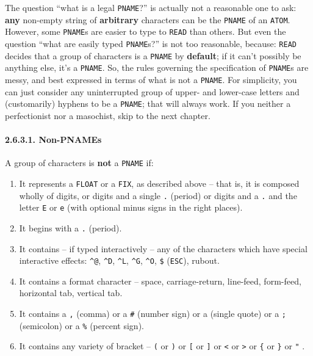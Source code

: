 \documentclass[a4paper,]{article}
\let\oldparagraph\paragraph
\renewcommand{\paragraph}[1]{\oldparagraph{#1}\mbox{}}
\begin{document}
The question ``what is a legal \texttt{PNAME}?'' is actually not a reasonable one to ask: \textbf{any} non-empty string of
\textbf{arbitrary} characters can be the \texttt{PNAME} of an \texttt{ATOM}. However, some \texttt{PNAME}s are easier to
type to \texttt{READ} than others. But even the question ``what are easily typed \texttt{PNAME}s?'' is not too reasonable,
because: \texttt{READ} decides that a group of characters is a \texttt{PNAME} by \textbf{default}; if it can't possibly be
anything else, it's a \texttt{PNAME}. So, the rules governing the specification of \texttt{PNAME}s are messy, and best
expressed in terms of what is not a \texttt{PNAME}. For simplicity, you can just consider any uninterrupted group of upper-
and lower-case letters and (customarily) hyphens to be a \texttt{PNAME}; that will always work. If you neither a
perfectionist nor a masochist, skip to the next chapter.

\paragraph{2.6.3.1. Non-PNAMEs}\label{non-pnames}

A group of characters is \textbf{not} a \texttt{PNAME} if:

\begin{enumerate}
\def\labelenumi{\arabic{enumi}.}
\item
  It represents a \texttt{FLOAT} or a \texttt{FIX}, as described above -- that is, it is composed wholly of digits, or
  digits and a single \texttt{.}  (period) or digits and a \texttt{.} and the letter \texttt{E} or
  \texttt{e} (with optional minus signs in the right places).
\item
  It begins with a \texttt{.} (period).
\item
  It contains -- if typed interactively -- any of the characters which have special interactive effects: \texttt{\^{}@},
  \texttt{\^{}D}, \texttt{\^{}L}, \texttt{\^{}G}, \texttt{\^{}O}, \texttt{\$} (\texttt{ESC}), rubout.
\item
  It contains a format character -- space, carriage-return, line-feed, form-feed, horizontal tab, vertical tab.
\item
  It contains a \texttt{,}  (comma) or a \texttt{\#} \index{\texttt{\#}} (number sign) or a
  \texttt{\textquotesingle{}}  (single quote) or a \texttt{;} \index{\texttt{;}} (semicolon) or a
  \texttt{\%} \index{\texttt{\%}} (percent sign).
\item
  It contains any variety of bracket -- \texttt{(} \index{\texttt{(}} or \texttt{)} \index{\texttt{)}} or
  \texttt{{[}}\index{\texttt{[}} or \texttt{{]}}\index{\texttt{]}} or \texttt{\textless{}} \index{\texttt{<}} or
  \texttt{\textgreater{}} \index{\texttt{>}} or \texttt{\{}  or \texttt{\}}
   or \texttt{"} .
\end{enumerate}
\end{document}
